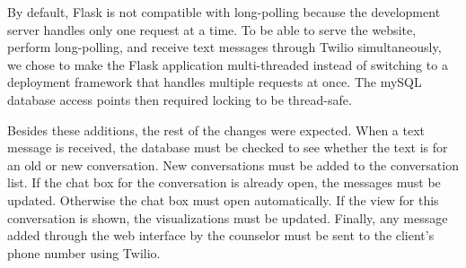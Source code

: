 By default, Flask is not compatible with long-polling because the development server handles only one request at a time. To be able to serve the website, perform long-polling, and receive text messages through Twilio simultaneously, we chose to make the Flask application multi-threaded instead of switching to a deployment framework that handles multiple requests at once. The mySQL database access points then required locking to be thread-safe.

Besides these additions, the rest of the changes were expected. When a text message is received, the database must be checked to see whether the text is for an old or new conversation. New conversations must be added to the conversation list. If the chat box for the conversation is already open, the messages must be updated. Otherwise the chat box must open automatically. If the view for this conversation is shown, the visualizations must be updated. Finally, any message added through the web interface by the counselor must be sent to the client's phone number using Twilio.
